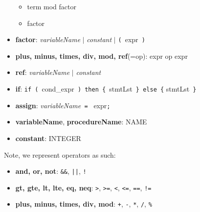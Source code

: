 \documentclass[12pt]{article}
\theoremstyle{definition}
\begin{document}
\begin{itemize}
\begin{itemize}
		\item term mod factor
		\item factor
	\end{itemize}
	\item \textbf{factor}: \textit{variableName} $|$ \textit{constant} $|$ \texttt{( }expr\texttt{ )}
	\item \textbf{plus, minus, times, div, mod, ref}(=op): expr op expr
	\item \textbf{ref}: \textit{variableName} $|$ \textit{constant}
	\item \textbf{if}: \texttt{if ( }cond\_expr\texttt{ ) then \{ }stmtLst\texttt{ \} else \{} stmtLst\texttt{ \}}
	\item \textbf{assign}: \textit{variableName}\texttt{ = } expr\texttt{;}
	\item \textbf{variableName}, \textbf{procedureName}: NAME
	\item \textbf{constant}: INTEGER
\end{itemize}
Note, we represent operators as such:
\begin{itemize}
	\item \textbf{and, or, not}: \texttt{\&\&}, \texttt{||}, \texttt{!}
	\item \textbf{gt, gte, lt, lte, eq, neq}: \texttt{>}, \texttt{>=}, \texttt{<}, \texttt{<=}, \texttt{==}, \texttt{!=}
	\item \textbf{plus, minus, times, div, mod}: \texttt{+}, \texttt{-}, \texttt{*}, \texttt{/}, \texttt{\%}
\end{itemize}
\end{document}
